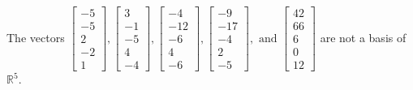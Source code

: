 \begin{exercise}
\begin{exerciseStatement}
  \end{exerciseStatement}
  \begin{exerciseAnswer}
   The vectors \(\left[\begin{array}{r}
-5 \\
-5 \\
2 \\
-2 \\
1
\end{array}\right] , \left[\begin{array}{r}
3 \\
-1 \\
-5 \\
4 \\
-4
\end{array}\right] , \left[\begin{array}{r}
-4 \\
-12 \\
-6 \\
4 \\
-6
\end{array}\right] , \left[\begin{array}{r}
-9 \\
-17 \\
-4 \\
2 \\
-5
\end{array}\right] , \text{ and } \left[\begin{array}{r}
42 \\
66 \\
6 \\
0 \\
12
\end{array}\right]\) 
  	 are not  a basis of \(\mathbb{R}^5\).
  


  \end{exerciseAnswer}
\end{exercise}